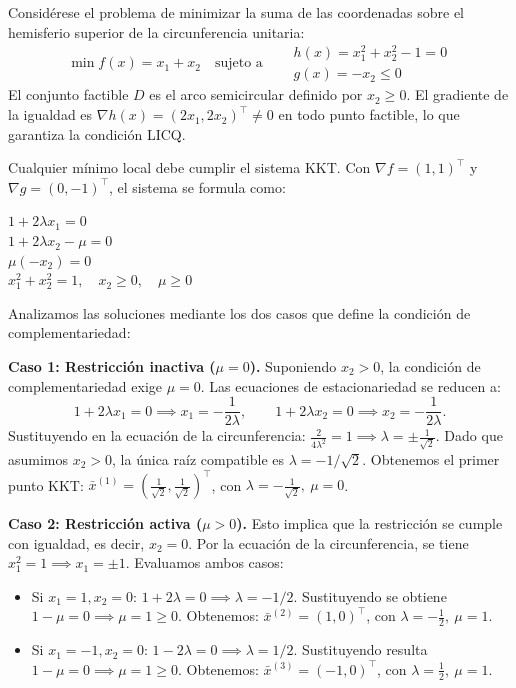 \begin{example}\label{v1:exa:kkt_mixto_esfera}
 Considérese el problema de minimizar la suma de las coordenadas sobre el hemisferio superior de la circunferencia unitaria:
 \[
 \min f(x) = x_1 + x_2 \quad \text{sujeto a} \quad \begin{aligned} &h(x) = x_1^2 + x_2^2 - 1 = 0 \\ &g(x) = -x_2 \le 0 \end{aligned}
 \]
 El conjunto factible $D$ es el arco semicircular definido por $x_2 \ge 0$. El gradiente de la igualdad es $\nabla h(x) = (2x_1, 2x_2)^\top \neq 0$ en todo punto factible, lo que garantiza la condición LICQ.
 
 Cualquier mínimo local debe cumplir el sistema KKT. Con $\nabla f = (1,1)^\top$ y $\nabla g = (0,-1)^\top$, el sistema se formula como:
 \begin{conditions}
 \conditem $1 + 2\lambda x_1 = 0$ \\
 \conditem $1 + 2\lambda x_2 - \mu = 0$ \\
 \conditem $\mu(-x_2) = 0$ \\
 \conditem $x_1^2 + x_2^2 = 1, \quad x_2 \ge 0, \quad \mu \ge 0$
 \end{conditions}
 
 Analizamos las soluciones mediante los dos casos que define la condición de complementariedad:
 
 \textbf{Caso 1: Restricción inactiva ($\mu = 0$).} Suponiendo $x_2 > 0$, la condición de complementariedad exige $\mu = 0$. Las ecuaciones de estacionariedad se reducen a:
 \[
 1 + 2\lambda x_1 = 0 \implies x_1 = -\frac{1}{2\lambda}, \qquad 1 + 2\lambda x_2 = 0 \implies x_2 = -\frac{1}{2\lambda}.
 \]
 Sustituyendo en la ecuación de la circunferencia: $\frac{2}{4\lambda^2} = 1 \implies \lambda = \pm \frac{1}{\sqrt{2}}$. Dado que asumimos $x_2 > 0$, la única raíz compatible es $\lambda = -1/\sqrt{2}$. Obtenemos el primer punto KKT: $\bar{x}^{(1)} = \left( \frac{1}{\sqrt{2}}, \frac{1}{\sqrt{2}} \right)^\top$, con $\lambda = -\frac{1}{\sqrt{2}}, \ \mu = 0$.
 
 \textbf{Caso 2: Restricción activa ($\mu > 0$).} Esto implica que la restricción se cumple con igualdad, es decir, $x_2 = 0$. Por la ecuación de la circunferencia, se tiene $x_1^2 = 1 \implies x_1 = \pm 1$. Evaluamos ambos casos:
 \begin{itemize}
 \item Si $x_1 = 1, x_2 = 0$: $1 + 2\lambda = 0 \implies \lambda = -1/2$. Sustituyendo se obtiene $1 - \mu = 0 \implies \mu = 1 \ge 0$. Obtenemos: $\bar{x}^{(2)} = (1, 0)^\top$, con $\lambda = -\frac{1}{2}, \ \mu = 1$.
 \item Si $x_1 = -1, x_2 = 0$: $1 - 2\lambda = 0 \implies \lambda = 1/2$. Sustituyendo resulta $1 - \mu = 0 \implies \mu = 1 \ge 0$. Obtenemos: $\bar{x}^{(3)} = (-1, 0)^\top$, con $\lambda = \frac{1}{2}, \ \mu = 1$.
 \end{itemize}
 

\end{example}
